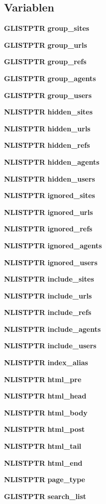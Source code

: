 \subsection*{Variablen}
\begin{CompactItemize}
\item 
{\bf GLISTPTR} {\bf group\_\-sites}
\item 
{\bf GLISTPTR} {\bf group\_\-urls}
\item 
{\bf GLISTPTR} {\bf group\_\-refs}
\item 
{\bf GLISTPTR} {\bf group\_\-agents}
\item 
{\bf GLISTPTR} {\bf group\_\-users}
\item 
{\bf NLISTPTR} {\bf hidden\_\-sites}
\item 
{\bf NLISTPTR} {\bf hidden\_\-urls}
\item 
{\bf NLISTPTR} {\bf hidden\_\-refs}
\item 
{\bf NLISTPTR} {\bf hidden\_\-agents}
\item 
{\bf NLISTPTR} {\bf hidden\_\-users}
\item 
{\bf NLISTPTR} {\bf ignored\_\-sites}
\item 
{\bf NLISTPTR} {\bf ignored\_\-urls}
\item 
{\bf NLISTPTR} {\bf ignored\_\-refs}
\item 
{\bf NLISTPTR} {\bf ignored\_\-agents}
\item 
{\bf NLISTPTR} {\bf ignored\_\-users}
\item 
{\bf NLISTPTR} {\bf include\_\-sites}
\item 
{\bf NLISTPTR} {\bf include\_\-urls}
\item 
{\bf NLISTPTR} {\bf include\_\-refs}
\item 
{\bf NLISTPTR} {\bf include\_\-agents}
\item 
{\bf NLISTPTR} {\bf include\_\-users}
\item 
{\bf NLISTPTR} {\bf index\_\-alias}
\item 
{\bf NLISTPTR} {\bf html\_\-pre}
\item 
{\bf NLISTPTR} {\bf html\_\-head}
\item 
{\bf NLISTPTR} {\bf html\_\-body}
\item 
{\bf NLISTPTR} {\bf html\_\-post}
\item 
{\bf NLISTPTR} {\bf html\_\-tail}
\item 
{\bf NLISTPTR} {\bf html\_\-end}
\item 
{\bf NLISTPTR} {\bf page\_\-type}
\item 
{\bf GLISTPTR} {\bf search\_\-list}
\end{CompactItemize}


